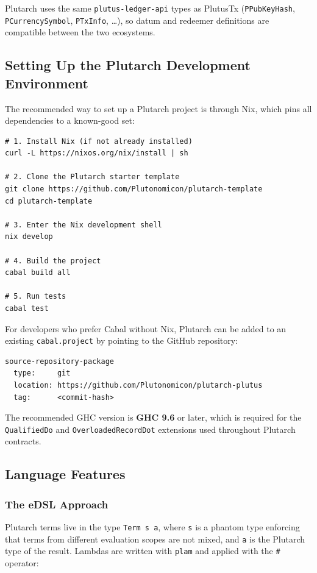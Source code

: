 Plutarch uses the same \texttt{plutus-ledger-api} types as PlutusTx (\texttt{PPubKeyHash}, \texttt{PCurrencySymbol}, \texttt{PTxInfo}, \ldots), so datum and redeemer definitions are compatible between the two ecosystems.

\subsection{Setting Up the Plutarch Development Environment}

The recommended way to set up a Plutarch project is through Nix, which pins all dependencies to a known-good set:

\begin{verbatim}
# 1. Install Nix (if not already installed)
curl -L https://nixos.org/nix/install | sh

# 2. Clone the Plutarch starter template
git clone https://github.com/Plutonomicon/plutarch-template
cd plutarch-template

# 3. Enter the Nix development shell
nix develop

# 4. Build the project
cabal build all

# 5. Run tests
cabal test
\end{verbatim}

For developers who prefer Cabal without Nix, Plutarch can be added to an existing \texttt{cabal.project} by pointing to the GitHub repository:

\begin{verbatim}
source-repository-package
  type:     git
  location: https://github.com/Plutonomicon/plutarch-plutus
  tag:      <commit-hash>
\end{verbatim}

The recommended GHC version is \textbf{GHC 9.6} or later, which is required for the \texttt{QualifiedDo} and \texttt{OverloadedRecordDot} extensions used throughout Plutarch contracts.

\subsection{Language Features}

\subsubsection{The eDSL Approach}

Plutarch terms live in the type \texttt{Term s a}, where \texttt{s} is a phantom type enforcing that terms from different evaluation scopes are not mixed, and \texttt{a} is the Plutarch type of the result. Lambdas are written with \texttt{plam} and applied with the \texttt{\#} operator:

